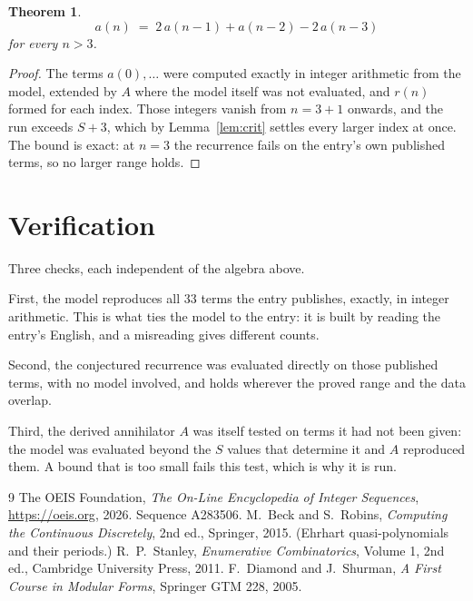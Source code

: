 \documentclass[11pt,a4paper]{article}
\theoremstyle{plain}
\newtheorem{theorem}{Theorem}
\theoremstyle{definition}
\begin{document}
\begin{theorem}
\[
a(n)\;=\;2\,a(n-1) + a(n-2) - 2\,a(n-3)
\]
for every $n>3$.
\end{theorem}

\begin{proof}
The terms $a(0),\dots$ were computed exactly in integer arithmetic from the model, extended by
$A$ where the model itself was not evaluated, and $r(n)$ formed for each index. Those integers
vanish from $n=3+1$ onwards, and the run exceeds $S+3$, which by
Lemma~\ref{lem:crit} settles every larger index at once. The bound is exact: at $n=3$ the recurrence fails on the entry's own published terms, so no larger range holds.
\end{proof}

\section{Verification}

Three checks, each independent of the algebra above.

First, the model reproduces all $33$ terms the entry publishes, exactly, in integer
arithmetic. This is what ties the model to the entry: it is built by reading the entry's
English, and a misreading gives different counts.

Second, the conjectured recurrence was evaluated directly on those published terms, with no
model involved, and holds wherever the proved range and the data overlap.

Third, the derived annihilator $A$ was itself tested on terms it had not been given: the model
was evaluated beyond the $S$ values that determine it and $A$ reproduced them. A bound that is
too small fails this test, which is why it is run.

\begin{thebibliography}{9}
 The OEIS Foundation, \emph{The On-Line Encyclopedia of Integer
Sequences}, \url{https://oeis.org}, 2026. Sequence A283506.
 M.~Beck and S.~Robins, \emph{Computing the Continuous Discretely},
2nd ed., Springer, 2015. (Ehrhart quasi-polynomials and their periods.)
 R.~P.~Stanley, \emph{Enumerative Combinatorics}, Volume 1, 2nd ed.,
Cambridge University Press, 2011.
 F.~Diamond and J.~Shurman, \emph{A First Course in Modular Forms},
Springer GTM 228, 2005.
\end{thebibliography}
\end{document}
